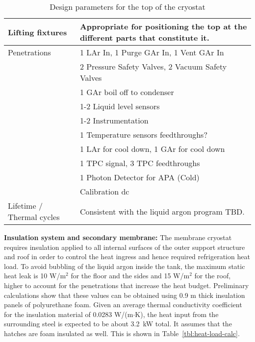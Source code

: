 \begin{table}[htpb]
\begin{tabular}{|p{}|p{}|}
Lifting fixtures  & Appropriate for positioning the top at the different parts that constitute it. \\ \hline
Penetrations  &  1 LAr In, 1 Purge GAr In, 1 Vent GAr In \\ 
& 2 Pressure Safety Valves, 2 Vacuum Safety Valves \\ 
& 1 GAr boil off to condenser \\ 
& 1-2 Liquid level sensors \\ 
& 1-2 Instrumentation \\ 
& 1 Temperature sensors feedthroughs? \\ 
& 1 LAr for cool down, 1 GAr for cool down \\ 
& 1 TPC signal, 3 TPC feedthroughs \\
& 1 Photon Detector for APA (Cold) \\
& Calibration dc\\ \hline
Lifetime / Thermal cycles  & Consistent with the liquid argon program TBD. \\ \hline
\end{tabular}
\caption{Design parameters for the top of the cryostat}
\label{tbl:cryostat-top-parameters}
\end{table}


\noindent \textbf{Insulation system and secondary membrane: }
%
The membrane cryostat requires insulation applied to all internal surfaces of the outer support structure 
and roof in order to control the heat ingress and hence required refrigeration heat load. 
To avoid bubbling of the liquid argon inside the tank, the maximum static heat leak is 10 W/m$^2$ for the floor and the sides and 15 W/m$^2$ for the roof, higher to account for the penetrations that increase the heat budget. Preliminary calculations show that these values can be obtained using 0.9 m thick insulation panels of polyurethane foam.
Given an 
average thermal conductivity coefficient for the insulation material of 0.0283 W/(m$\cdot$K), the heat input 
from the surrounding steel is expected to be about 3.2~kW total. It assumes that the hatches are foam 
insulated as well. This is shown in Table~\ref{tbl:heat-load-calc}.\\

